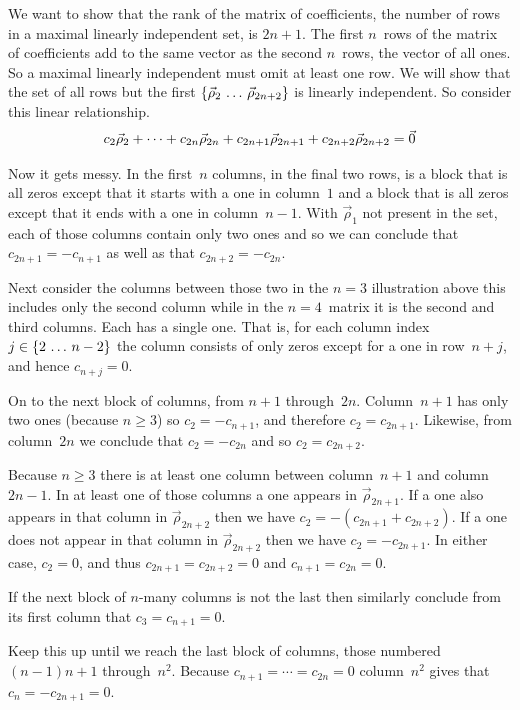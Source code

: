 We want to show that the rank of the matrix of coefficients,
the number of rows in a maximal linearly independent set, is $2n+1$.
The first $n$~rows of the matrix of coefficients add to the same vector
as the second $n$~rows, the vector of all ones.
So a maximal linearly independent must omit at least one row.
We will show that the set of all rows but the first 
$\mbox{$\{\vec{\rho}_2\,\ldots\, \vec{\rho}_{2n+2}\}$}$
is linearly independent.
So consider this linear relationship.
\begin{equation*}
  c_2\vec{\rho}_2+\cdots+c_{2n}\vec{\rho}_{2n}
     +c_{2n+1}\vec{\rho}_{2n+1}+c_{2n+2}\vec{\rho}_{2n+2}=\vec{0}
\end{equation*}

Now it gets messy.
In the first~$n$ columns, in the final two rows, is a block that 
is all zeros except that it starts with a one in column~$1$
and a block that is all zeros except that it ends with a one
in column~$n-1$.
With $\vec{\rho}_1$ not present in the set, each of those columns contain only 
two ones and so we can conclude that $c_{2n+1}=-c_{n+1}$ as well as that
$c_{2n+2}=-c_{2n}$.

Next consider the columns between those two\Dash
in the $n=3$ illustration above this includes only the second column while 
in the $n=4$~matrix it is the second and third columns.
Each has a single one.
That is, for each column index $j\in\mbox{$\{2\,\ldots\, n-2\}$}$
the column consists of only zeros except for a one in row~$n+j$, 
and hence $c_{n+j}=0$.

On to the next block of columns, from $n+1$ through~$2n$.
Column~$n+1$ has only two ones (because $n\geq 3$) so $c_2=-c_{n+1}$,
and therefore $c_2=c_{2n+1}$.
Likewise, from column~$2n$ we conclude that $c_2=-c_{2n}$
and so $c_2=c_{2n+2}$.  

Because $n\geq 3$
there is at least one column between column~$n+1$ and column~$2n-1$.
In at least one of those columns a one appears in $\vec{\rho}_{2n+1}$.
If a one also appears in that column in $\vec{\rho}_{2n+2}$ then we have 
$c_2=-(c_{2n+1}+c_{2n+2})$.
If a one does not appear in that column in $\vec{\rho}_{2n+2}$
then we have $c_2=-c_{2n+1}$.
In either case, $c_2=0$, and thus 
$c_{2n+1}=c_{2n+2}=0$ and  
$c_{n+1}=c_{2n}=0$.

If the next block of $n$-many columns is not the last then similarly
conclude from its 
first column that $c_3=c_{n+1}=0$.

Keep this up until we reach the last block of columns, those numbered
$(n-1)n+1$ through~$n^2$.
Because $c_{n+1}=\cdots=c_{2n}=0$ column~$n^2$ 
gives that $c_{n}=-c_{2n+1}=0$.

